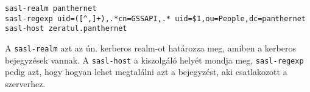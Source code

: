 \begin{Verbatim}[frame=single]
sasl-realm panthernet
sasl-regexp uid=([^,]+),.*cn=GSSAPI,.* uid=$1,ou=People,dc=panthernet
sasl-host zeratul.panthernet
\end{Verbatim}

A \texttt{sasl-realm} azt az ún. kerberos realm-ot határozza meg, amiben a kerberos bejegyzések vannak. A
\texttt{sasl-host} a kiszolgáló helyét mondja meg, \texttt{sasl-regexp} pedig azt, hogy hogyan lehet megtalálni azt a
bejegyzést, aki csatlakozott a szerverhez.

